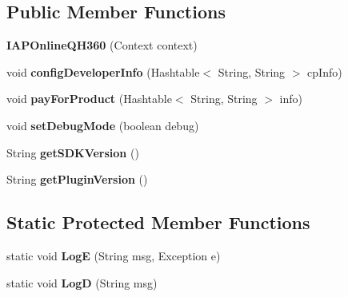 \subsection*{Public Member Functions}
\begin{DoxyCompactItemize}
\item 
\mbox{\label{classorg_1_1cocos2dx_1_1plugin_1_1IAPOnlineQH360_a1d6d87a4313cef54e23a0848fcb0cdd4}} 
{\bfseries I\+A\+P\+Online\+Q\+H360} (Context context)
\item 
\mbox{\label{classorg_1_1cocos2dx_1_1plugin_1_1IAPOnlineQH360_aa382366a16f27a4f4c3b10a041ba3524}} 
void {\bfseries config\+Developer\+Info} (Hashtable$<$ String, String $>$ cp\+Info)
\item 
\mbox{\label{classorg_1_1cocos2dx_1_1plugin_1_1IAPOnlineQH360_a09ecc734393ab1ace54519bc3269bc3d}} 
void {\bfseries pay\+For\+Product} (Hashtable$<$ String, String $>$ info)
\item 
\mbox{\label{classorg_1_1cocos2dx_1_1plugin_1_1IAPOnlineQH360_a1acf9cd08f7f1d3e72185e0c157d2acc}} 
void {\bfseries set\+Debug\+Mode} (boolean debug)
\item 
\mbox{\label{classorg_1_1cocos2dx_1_1plugin_1_1IAPOnlineQH360_a850f13b63489e24991f0cc8e1a41becb}} 
String {\bfseries get\+S\+D\+K\+Version} ()
\item 
\mbox{\label{classorg_1_1cocos2dx_1_1plugin_1_1IAPOnlineQH360_a8bb19131b7f81656ef0d87ecf344fd1a}} 
String {\bfseries get\+Plugin\+Version} ()
\end{DoxyCompactItemize}
\subsection*{Static Protected Member Functions}
\begin{DoxyCompactItemize}
\item 
\mbox{\label{classorg_1_1cocos2dx_1_1plugin_1_1IAPOnlineQH360_a15556e4cb234bc3e7829c31777ddbf00}} 
static void {\bfseries LogE} (String msg, Exception e)
\item 
\mbox{\label{classorg_1_1cocos2dx_1_1plugin_1_1IAPOnlineQH360_ab24715bb5418e3275bf1f246a8c68e95}} 
static void {\bfseries LogD} (String msg)
\end{DoxyCompactItemize}
